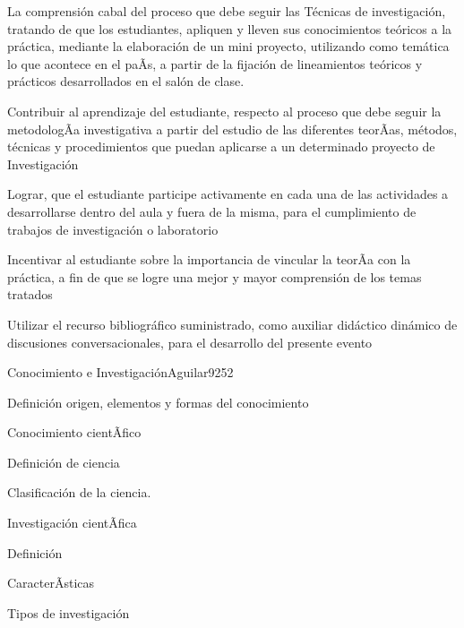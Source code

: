 \begin{syllabus}


\begin{justification}
La comprensión cabal del proceso que debe seguir las Técnicas de
investigación,  tratando de que los estudiantes, apliquen y lleven 
sus conocimientos teóricos a la  práctica, mediante la elaboración 
de un mini proyecto,  utilizando como temática  lo que acontece en 
el paÃ­s,  a partir de la fijación de lineamientos  teóricos y 
prácticos desarrollados en el salón de clase.
\end{justification}

\begin{goals}
\item Contribuir al aprendizaje del estudiante, respecto al proceso que debe seguir la metodologÃ­a investigativa a partir del estudio de las diferentes teorÃ­as, métodos, técnicas y procedimientos que puedan aplicarse a un determinado proyecto de Investigación 
\item Lograr, que el estudiante participe activamente  en cada una de las actividades a desarrollarse dentro del aula  y fuera de la misma, para el cumplimiento de trabajos de investigación o laboratorio
\item Incentivar al estudiante sobre la  importancia de vincular la teorÃ­a con la práctica, a fin de que se logre una mejor y mayor comprensión de los temas tratados
\item Utilizar el recurso bibliográfico suministrado, como auxiliar didáctico dinámico de discusiones conversacionales,  para el desarrollo del presente evento
\end{goals}

\begin{outcomes}
\end{outcomes}

\begin{unit}{Conocimiento e Investigación}{Aguilar92}{5}{2}
   \begin{topics}
      \item Definición origen, elementos y formas del conocimiento
	\item Conocimiento cientÃ­fico
	\item Definición de ciencia
	\item Clasificación de la ciencia.
	\item Investigación cientÃ­fica
	\item Definición
	\item CaracterÃ­sticas
	\item Tipos de investigación
   \end{topics}


\end{unit}
\end{syllabus}
